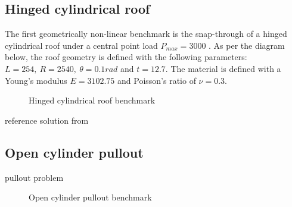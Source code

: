 \subsection{Hinged cylindrical roof}

The first geometrically non-linear benchmark is the snap-through of a hinged cylindrical roof under a central point load $P_{max} = 3000$ \cite{Sze2004}. As per the diagram below, the roof geometry is defined with the following parameters: $L = 254,\ R = 2540,\ \theta=0.1rad$ and $t = 12.7$. The material is defined with a Young's modulus $E = 3102.75$ and Poisson's ratio of $\nu = 0.3$.

 
\begin{figure}[H]
	\caption{\label{ref_label_overall}Hinged cylindrical roof benchmark}
\end{figure}

 

reference solution from \cite{Sze2004}

\subsection{Open cylinder pullout}

pullout problem

 
\begin{figure}[H]
	\caption{\label{ref_label_overall}Open cylinder pullout benchmark}
\end{figure}


